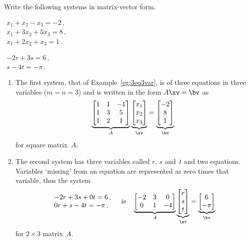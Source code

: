 \begin{example} \label{eg:matvecsys}
Write the following systems in matrix-vector form.
\begin{parts}
\item \(\begin{array}{l}
x_1+x_2-x_3=-2\,,\\
x_1+3x_2+5x_3=8\,,\\
x_1+2x_2+x_3=1\,.
\end{array}\)

\item \(\begin{array}{l} -2r+3s=6\,,\\s-4t=-\pi\,. \end{array}\)
\end{parts}
\begin{solution} 
\begin{enumerate}
\item The first system, that of Example~\ref{eg:3eq3var}, is of three equations in three variables (\(m=n=3\)) and is written in the form \(A\xv=\bv\) as
\begin{equation*}
\underbrace{\begin{bmatrix} 1&1&-1\\ 1&3&5\\1&2&1 \end{bmatrix}}_A
\underbrace{\begin{bmatrix} x_1\\x_2\\x_3 \end{bmatrix}}_\xv
=\underbrace{\begin{bmatrix} -2\\8\\1 \end{bmatrix}}_\bv 
\end{equation*}
for square matrix~\(A\).

\item The second system has three variables called \(r\), \(s\) and~\(t\) and two equations.
Variables `missing' from an equation are represented as zero times that variable, thus the system
\begin{equation*}
\begin{array}{l} -2r+3s+0t=6\,,\\0r+s-4t=-\pi\,, \end{array}
\quad\text{is}\quad
\underbrace{\begin{bmatrix} -2&3&0\\ 0&1&-4 \end{bmatrix}}_A
\underbrace{\begin{bmatrix} r\\s\\t \end{bmatrix}}_\xv
=\underbrace{\begin{bmatrix} 6\\-\pi \end{bmatrix}}_\bv 
\end{equation*}
for \(2\times3\) matrix~\(A\).
\end{enumerate}
\end{solution}
\end{example}



